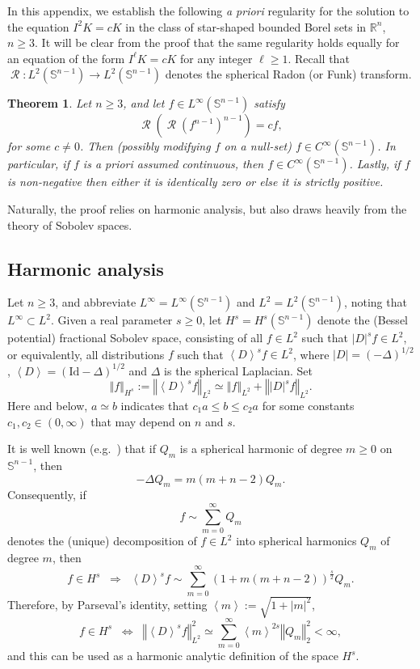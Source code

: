 \documentclass[11pt]{article}
\newtheorem{thm}{Theorem}[section]
\theoremstyle{definition}
\theoremstyle{proof}
\DeclareMathOperator{\+}{\mathop{\tilde{+}}}
\DeclareMathOperator{\Rad}{\mathcal{R}}
\newcommand{\norm}[1]{\left\Vert#1\right\Vert}
\newcommand{\di}[1]{\left<#1\right>}
\newcommand{\R}{\mathbb{R}}
\renewcommand{\S}{\mathbb{S}}
\newcommand{\Id}{\textrm{Id}}
\numberwithin{equation}{section}
\numberwithin{equation}{section}
\begin{document}
In this appendix, we establish the following {\it a priori} regularity for the solution to the equation $I^2 K = c K$ in the class of star-shaped bounded Borel sets in $\R^n$, $n \geq 3$. It will be clear from the proof that the same regularity holds equally for an equation of the form $I^\ell K = c K$ for any integer $\ell \geq 1$. Recall that $\Rad : L^2(\S^{n-1}) \rightarrow L^2(\S^{n-1})$ denotes the spherical Radon (or Funk) transform. 

\begin{thm} \label{thm:regularity}
Let $n \geq 3$, and let $f \in L^\infty(\S^{n-1})$ satisfy
\begin{equation} \label{eq:R-equation}
\Rad(\Rad(f^{n-1})^{n-1}) = c f ,
\end{equation}
for some $c \neq 0$. Then (possibly modifying $f$ on a null-set) $f \in C^\infty(\S^{n-1})$. In particular, if $f$ is {\it a priori} assumed continuous, then $f \in C^\infty(\S^{n-1})$.
Lastly, if $f$ is non-negative then either it is identically zero or else it is strictly positive. 
\end{thm}

Naturally, the proof relies on harmonic analysis, but also draws heavily from the theory of Sobolev spaces. 

\subsection{Harmonic analysis}

Let $n \geq 3$, and abbreviate $L^\infty = L^\infty(\S^{n-1})$ and $L^2 = L^2(\S^{n-1})$, noting that $L^\infty \subset L^2$. Given a real parameter $s \geq 0$, let $H^s = H^s(\S^{n-1})$ denote the (Bessel potential) fractional Sobolev space, consisting of all $f \in L^2$ such that $|D|^s f \in L^2$, or equivalently, all distributions $f$ 
such that $\di{D}^s f \in L^2$, where $|D| = (-\Delta)^{1/2}$, $\di{D} = (\Id - \Delta)^{1/2}$ and $\Delta$ is the spherical Laplacian. Set
\[
 \norm{f}_{H^s} := \norm{\di{D}^s f}_{L^2} \simeq \norm{f}_{L^2} + \norm{|D|^s f}_{L^2} . 
\]
Here and below, $a \simeq b$ indicates that $c_1 a \leq b \leq c_2 a$ for some constants $c_1,c_2 \in (0,\infty)$ that may depend on $n$ and $s$.

It is well known (e.g.~\cite{Groemer}) that if $Q_m$ is a spherical harmonic of degree $m \geq 0$ on $\S^{n-1}$, then
\[
-\Delta Q_m = m (m + n - 2) Q_m .
\]
Consequently, if
\[
f \sim \sum_{m=0}^\infty Q_m 
\]
denotes the (unique) decomposition of $f \in L^2$ into spherical harmonics $Q_m$ of degree $m$, then
\[
f \in H^s \;\; \Rightarrow \;\; \di{D}^s f \sim \sum_{m=0}^\infty  (1 + m (m + n - 2))^{\frac{s}{2}} Q_m .
\]
Therefore, by Parseval's identity, setting $\di{m} := \sqrt{1+|m|^2}$,
\begin{equation} \label{eq:Hs-norm}
f \in H^s \;\; \Leftrightarrow \;\; \norm{\di{D}^s f}_{L^2}^2 \simeq \sum_{m=0}^\infty \di{m}^{2s} \norm{Q_m}_2^2 < \infty ,
\end{equation}
and this can be used as a harmonic analytic definition of the space $H^s$.
\end{document}
